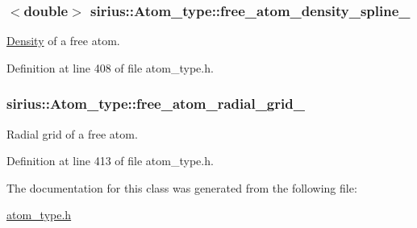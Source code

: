 \subsubsection[{free\+\_\+atom\+\_\+density\+\_\+spline\+\_\+}]{$<$double$>$ sirius\+::\+Atom\+\_\+type\+::free\+\_\+atom\+\_\+density\+\_\+spline\+\_\+\hspace{0.3cm}{\ttfamily [protected]}}\label{classsirius_1_1_atom__type_a6eecfa70423000229cddd9af4726f6c1}


\hyperlink{classsirius_1_1_density}{Density} of a free atom. 



Definition at line 408 of file atom\+\_\+type.\+h.

\hypertarget{classsirius_1_1_atom__type_a63cd7fcff6f20ba748357553934009f0}{}
\subsubsection[{free\+\_\+atom\+\_\+radial\+\_\+grid\+\_\+}]{ sirius\+::\+Atom\+\_\+type\+::free\+\_\+atom\+\_\+radial\+\_\+grid\+\_\+\hspace{0.3cm}{\ttfamily [protected]}}\label{classsirius_1_1_atom__type_a63cd7fcff6f20ba748357553934009f0}


Radial grid of a free atom. 



Definition at line 413 of file atom\+\_\+type.\+h.



The documentation for this class was generated from the following file\+:\begin{DoxyCompactItemize}
\item 
\hyperlink{atom__type_8h}{atom\+\_\+type.\+h}\end{DoxyCompactItemize}
